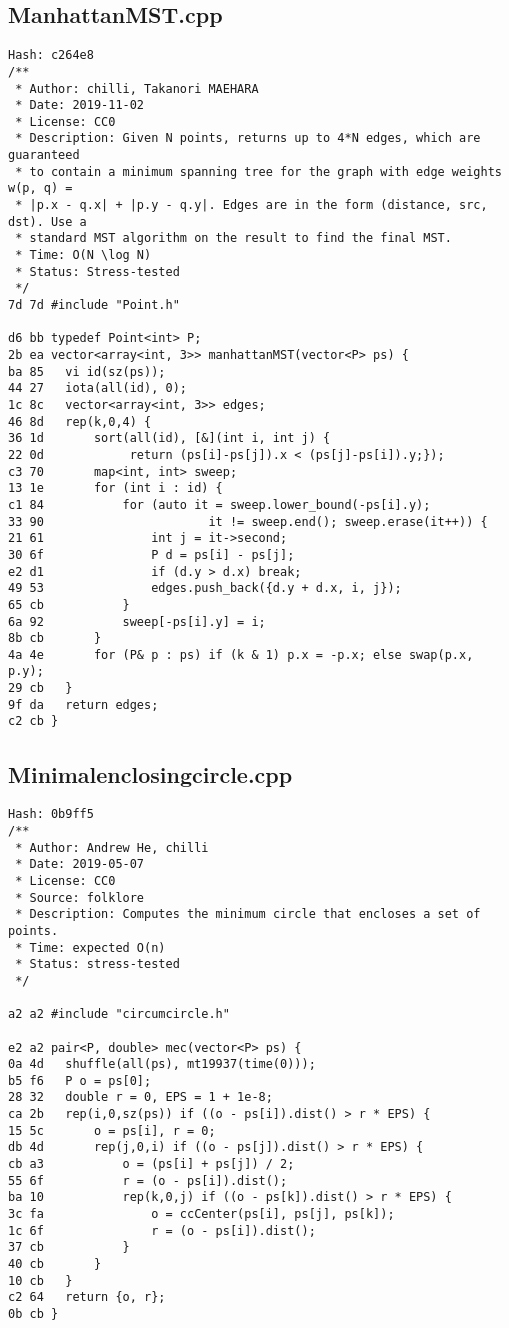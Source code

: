 \documentclass[11pt, a4paper, twoside]{article}
\begin{document}
\subsection{ManhattanMST.cpp}
\begin{lstlisting}
Hash: c264e8
/**
 * Author: chilli, Takanori MAEHARA
 * Date: 2019-11-02
 * License: CC0
 * Description: Given N points, returns up to 4*N edges, which are guaranteed
 * to contain a minimum spanning tree for the graph with edge weights w(p, q) =
 * |p.x - q.x| + |p.y - q.y|. Edges are in the form (distance, src, dst). Use a
 * standard MST algorithm on the result to find the final MST.
 * Time: O(N \log N)
 * Status: Stress-tested
 */
7d 7d #include "Point.h"

d6 bb typedef Point<int> P;
2b ea vector<array<int, 3>> manhattanMST(vector<P> ps) {
ba 85 	vi id(sz(ps));
44 27 	iota(all(id), 0);
1c 8c 	vector<array<int, 3>> edges;
46 8d 	rep(k,0,4) {
36 1d 		sort(all(id), [&](int i, int j) {
22 0d 		     return (ps[i]-ps[j]).x < (ps[j]-ps[i]).y;});
c3 70 		map<int, int> sweep;
13 1e 		for (int i : id) {
c1 84 			for (auto it = sweep.lower_bound(-ps[i].y);
33 90 				        it != sweep.end(); sweep.erase(it++)) {
21 61 				int j = it->second;
30 6f 				P d = ps[i] - ps[j];
e2 d1 				if (d.y > d.x) break;
49 53 				edges.push_back({d.y + d.x, i, j});
65 cb 			}
6a 92 			sweep[-ps[i].y] = i;
8b cb 		}
4a 4e 		for (P& p : ps) if (k & 1) p.x = -p.x; else swap(p.x, p.y);
29 cb 	}
9f da 	return edges;
c2 cb }
\end{lstlisting}

\subsection{Minimalenclosingcircle.cpp}
\begin{lstlisting}
Hash: 0b9ff5
/**
 * Author: Andrew He, chilli
 * Date: 2019-05-07
 * License: CC0
 * Source: folklore
 * Description: Computes the minimum circle that encloses a set of points.
 * Time: expected O(n)
 * Status: stress-tested
 */

a2 a2 #include "circumcircle.h"

e2 a2 pair<P, double> mec(vector<P> ps) {
0a 4d 	shuffle(all(ps), mt19937(time(0)));
b5 f6 	P o = ps[0];
28 32 	double r = 0, EPS = 1 + 1e-8;
ca 2b 	rep(i,0,sz(ps)) if ((o - ps[i]).dist() > r * EPS) {
15 5c 		o = ps[i], r = 0;
db 4d 		rep(j,0,i) if ((o - ps[j]).dist() > r * EPS) {
cb a3 			o = (ps[i] + ps[j]) / 2;
55 6f 			r = (o - ps[i]).dist();
ba 10 			rep(k,0,j) if ((o - ps[k]).dist() > r * EPS) {
3c fa 				o = ccCenter(ps[i], ps[j], ps[k]);
1c 6f 				r = (o - ps[i]).dist();
37 cb 			}
40 cb 		}
10 cb 	}
c2 64 	return {o, r};
0b cb }
\end{lstlisting}
\end{document}
